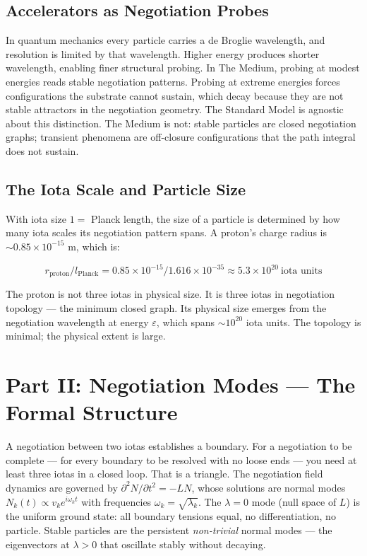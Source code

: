 \documentclass[11pt,letterpaper]{article}
\newenvironment{plainbox}{\begin{tcolorbox}[colback=blue!3!white,colframe=blue!40!white,title={\small\textit{In plain language}},breakable]}{\end{tcolorbox}}
\begin{document}
\subsection{Accelerators as Negotiation Probes}
\label{sec:orgafa23be}

In quantum mechanics every particle carries a de Broglie wavelength, and resolution is limited by that wavelength. Higher energy produces shorter wavelength, enabling finer structural probing. In The Medium, probing at modest energies reads stable negotiation patterns. Probing at extreme energies forces configurations the substrate cannot sustain, which decay because they are not stable attractors in the negotiation geometry. The Standard Model is agnostic about this distinction. The Medium is not: stable particles are closed negotiation graphs; transient phenomena are off-closure configurations that the path integral does not sustain.

\subsection{The Iota Scale and Particle Size}
\label{sec:orgf370d43}

With iota size \(1 =\) Planck length, the size of a particle is determined by how many iota scales its negotiation pattern spans. A proton's charge radius is \({\sim}0.85 \times 10^{-15}\) m, which is:

\begin{equation}
r_\text{proton} / l_\text{Planck} = 0.85 \times 10^{-15} / 1.616 \times 10^{-35} \approx 5.3 \times 10^{20}\ \text{iota units}
\end{equation}

The proton is not three iotas in physical size. It is three iotas in negotiation topology --- the minimum closed graph. Its physical size emerges from the negotiation wavelength at energy \(\varepsilon\), which spans \({\sim}10^{20}\) iota units. The topology is minimal; the physical extent is large.

\section{Part II: Negotiation Modes --- The Formal Structure}
\label{sec:orge86758f}

\begin{plainbox}
A negotiation between two iotas establishes a boundary. For a negotiation to be complete --- for every boundary to be resolved with no loose ends --- you need at least three iotas in a closed loop. That is a triangle. The negotiation field dynamics are governed by \(\partial^2 N/\partial t^2 = -LN\), whose solutions are normal modes \(N_k(t) \propto v_k e^{i\omega_k t}\) with frequencies \(\omega_k = \sqrt{\lambda_k}\). The \(\lambda = 0\) mode (null space of \(L\)) is the uniform ground state: all boundary tensions equal, no differentiation, no particle. Stable particles are the persistent \textit{non-trivial} normal modes --- the eigenvectors at \(\lambda > 0\) that oscillate stably without decaying.
\end{plainbox}
\end{document}
